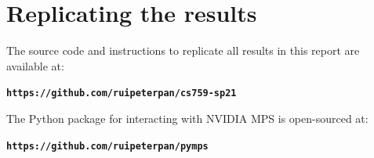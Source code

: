 \documentclass{article}
\begin{document}
\vfill




\appendix

\section{Replicating the results}
%
The source code and instructions to replicate all results in this report are available at:
\begin{center}
\textbf{\texttt{https://github.com/ruipeterpan/cs759-sp21}}
\end{center}

The Python package for interacting with NVIDIA MPS is open-sourced at:
\begin{center}
\textbf{\texttt{https://github.com/ruipeterpan/pymps}}
\end{center}


\end{document}
